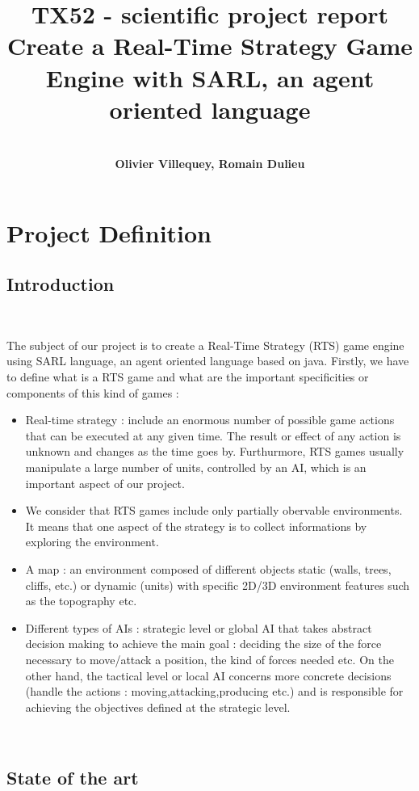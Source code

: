 \documentclass[a4paper,10pt]{book}
\title{\textbf{TX52 - scientific project report }\\
  Create a Real-Time Strategy Game Engine with SARL, an agent oriented language}
\author{~\\
  \textbf{Olivier Villequey, Romain Dulieu} }
\begin{document}
\maketitle

\tableofcontents

\chapter{Project Definition}

\section {Introduction}
~

The subject of our project is to create a Real-Time Strategy (RTS) game engine using SARL language, an agent oriented language based on java.
Firstly, we have to define what is a RTS game and what are the important specificities or components of this kind of games :
\begin{itemize}
 \item Real-time strategy : include an enormous number of possible game actions that can be executed at any given time. The result or effect of any action is unknown
  and changes as the time goes by. Furthurmore, RTS games usually manipulate a large number of units, controlled by an AI, which is an important aspect of our project. 
 \item We consider that RTS games include only partially obervable environments. It means that one aspect of the strategy is to collect informations by exploring the environment.
 \item A map : an environment composed of different objects static (walls, trees, cliffs, etc.) or dynamic (units) with specific 2D/3D environment features such as the topography etc.
 \item Different types of AIs : strategic level or global AI that takes abstract decision making to achieve the main goal : deciding the size of the force necessary to move/attack a position, the kind of forces needed etc. 
  On the other hand, the tactical level or local AI concerns more concrete decisions (handle the actions : moving,attacking,producing etc.) and is responsible for achieving the objectives defined at the strategic level.
\end{itemize}

~

\section {State of the art}
\end{document}
